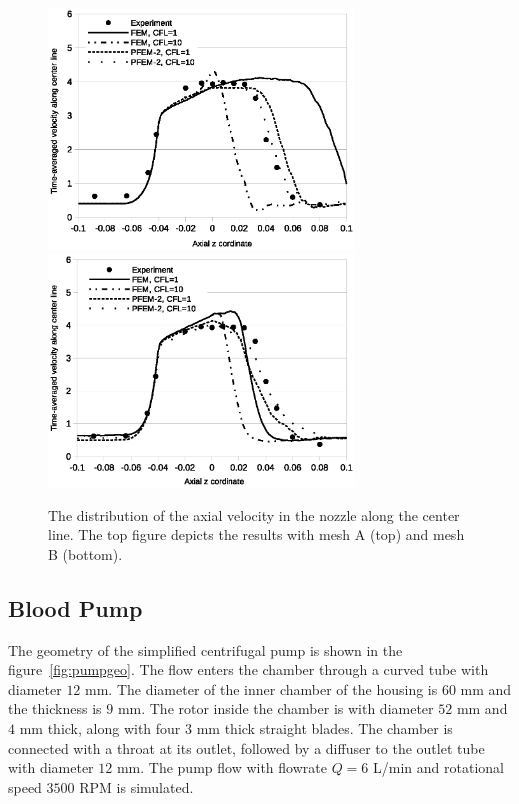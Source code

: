 \begin{figure}[htbp]
    \centering
    \includegraphics[width=3.2in]{imgs/nozzle_pump/nozzle_midvel_fm2.eps}
    \includegraphics[width=3.2in]{imgs/nozzle_pump/nozzle_midvel_pm2.eps}
    \caption{The distribution of the axial velocity in the nozzle along the center line. The top figure depicts the results with mesh A (top) and mesh B (bottom).
}
    \label{fig:nozzlemidvel}
\end{figure}

\subsection{Blood Pump}

The geometry of the simplified centrifugal pump is shown in the figure~\ref{fig:pumpgeo}. The flow enters the chamber through a curved tube with diameter $12$ mm. The diameter of the inner chamber of the housing is $60$ mm and the thickness is $9$ mm. The rotor inside the chamber is with diameter $52$ mm and $4$ mm thick, along with four $3$ mm thick straight blades. The chamber is connected with a throat at its outlet, followed by a diffuser to the outlet tube with diameter $12$ mm. The pump flow with flowrate $Q = 6$ L/min and rotational speed $3500$ RPM is simulated. 


